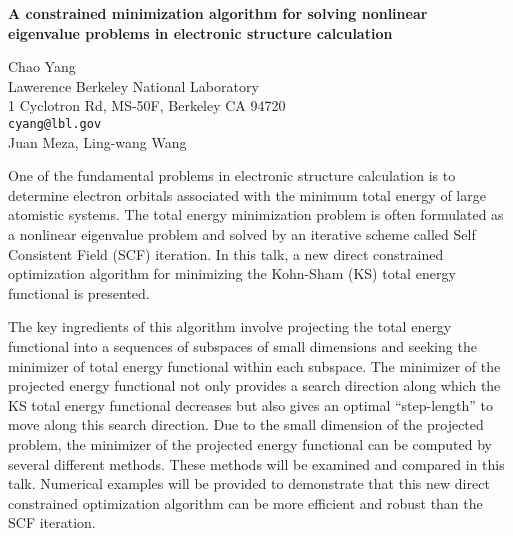 \documentclass{report}
\begin{document}

\begin{center}
{\large
{\bf A constrained minimization algorithm for solving nonlinear \\
	eigenvalue problems in electronic structure calculation}}

	Chao Yang \\
	Lawerence Berkeley National Laboratory \\
	1 Cyclotron Rd, MS-50F, Berkeley CA 94720 \\
	{\tt cyang@lbl.gov} \\
	Juan Meza, Ling-wang Wang
\end{center}
One of the fundamental problems in electronic structure
calculation is to determine electron orbitals associated
with the minimum total energy of large atomistic systems.
The total energy minimization problem is often formulated as
a nonlinear eigenvalue problem and solved by an iterative
scheme called Self Consistent Field (SCF) iteration. In this
talk, a new direct constrained optimization algorithm for
minimizing the Kohn-Sham (KS) total energy functional is
presented.

The key ingredients of this algorithm involve
projecting the total energy functional into a sequences of
subspaces of small dimensions and seeking the minimizer of
total energy functional within each subspace. The minimizer
of the projected energy functional not only provides a
search direction along which the KS total energy functional
decreases but also gives an optimal ``step-length'' to move
along this search direction. Due to the small dimension of
the projected problem, the minimizer of the projected energy
functional can be computed by several different methods.
These methods will be examined and compared in this talk.
Numerical examples will be provided to demonstrate that this
new direct constrained optimization algorithm can be more
efficient and robust than the SCF iteration.



\end{document}
